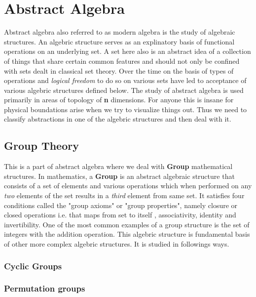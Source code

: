\chapter{Abstract Algebra }

Abstract algebra also referred to as modern algebra is the study of algebraic structures. An algebric structure serves as an explinatory basis of functional operations on an underlying set. A set here also is an abstract idea of a collection of things that share certain common features and should not only be confined with sets dealt in classical set theory. Over the time on the basis of types of operations and \textit{logical freedom} to do so on various sets have led to acceptance of various algebric structures defined below. The study of abstract algebra is used primarily in areas of topology of \textbf{n} dimensions. For anyone this is insane for physical boundations arise when we try to visualize things out. Thus we need to classify abstractions in one of the algebric structures and then deal with it. 

\section{Group Theory}

This is a part of abstract algebra where we deal with \textbf{Group} mathematical structures. In mathematics, a \textbf{Group} is an abstract algebraic structure that consists of a set of elements and various operations which when performed on any \textit{two} elements of the set results in a \textit{third} element from same set. It satisfies four conditions called the "group axioms" or "group properties", namely closure or closed operations i.e. that maps from set to itself , associativity, identity and invertibility. One of the most common examples of a group structure is the set of integers with the addition operation. This algebric structure is fundamental basis of other more complex algebric structures. It is studied in followings ways.\\

\subsection{Cyclic Groups}

\lipsum[1]

\subsection{Permutation groups}
